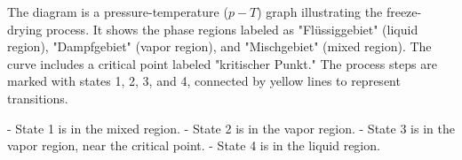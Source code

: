 The diagram is a pressure-temperature (\(p-T\)) graph illustrating the freeze-drying process. It shows the phase regions labeled as "Flüssiggebiet" (liquid region), "Dampfgebiet" (vapor region), and "Mischgebiet" (mixed region). The curve includes a critical point labeled "kritischer Punkt." The process steps are marked with states 1, 2, 3, and 4, connected by yellow lines to represent transitions.  

- State 1 is in the mixed region.  
- State 2 is in the vapor region.  
- State 3 is in the vapor region, near the critical point.  
- State 4 is in the liquid region.